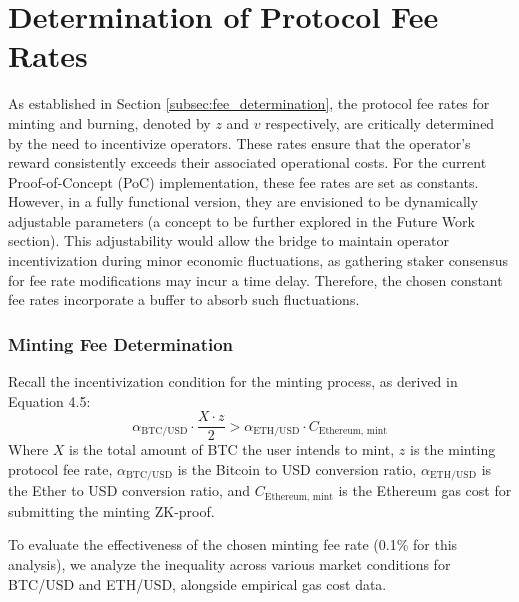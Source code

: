 \documentclass{DESSThesis}
\begin{document}
\section{Determination of Protocol Fee Rates} \label{sec:fee_rate_determination}
As established in Section \ref{subsec:fee_determination}, the protocol fee rates for minting and burning, denoted by \(z\) and \(v\) respectively, are critically determined by the need to incentivize operators. These rates ensure that the operator's reward consistently exceeds their associated operational costs. For the current Proof-of-Concept (PoC) implementation, these fee rates are set as constants. However, in a fully functional version, they are envisioned to be dynamically adjustable parameters (a concept to be further explored in the Future Work section). This adjustability would allow the bridge to maintain operator incentivization during minor economic fluctuations, as gathering staker consensus for fee rate modifications may incur a time delay. Therefore, the chosen constant fee rates incorporate a buffer to absorb such fluctuations.

\subsubsection{Minting Fee Determination}
Recall the incentivization condition for the minting process, as derived in Equation 4.5:
\[
\alpha_{\text{BTC/USD}} \cdot \frac{X \cdot z}{2} > \alpha_{\text{ETH/USD}} \cdot C_{\text{Ethereum, mint}}
\]
Where \(X\) is the total amount of BTC the user intends to mint, \(z\) is the minting protocol fee rate, \(\alpha_{\text{BTC/USD}}\) is the Bitcoin to USD conversion ratio, \(\alpha_{\text{ETH/USD}}\) is the Ether to USD conversion ratio, and \(C_{\text{Ethereum, mint}}\) is the Ethereum gas cost for submitting the minting ZK-proof.

To evaluate the effectiveness of the chosen minting fee rate (0.1\% for this analysis), we analyze the inequality across various market conditions for BTC/USD and ETH/USD, alongside empirical gas cost data.
\end{document}
